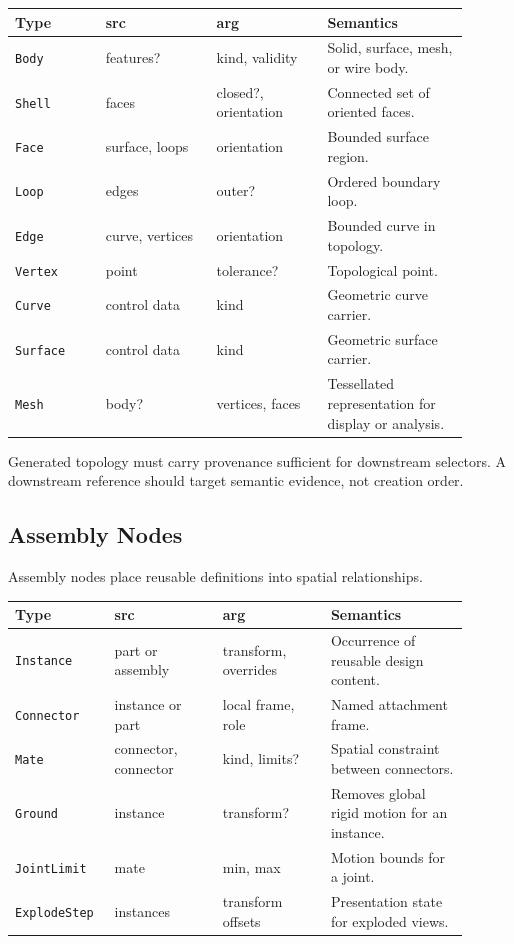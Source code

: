 \documentclass[11pt]{article}
\newcommand{\Type}[1]{\texttt{#1}}
\begin{document}
\begin{center}
\small
\begin{tabular}{@{}p{0.18\linewidth}p{0.22\linewidth}p{0.22\linewidth}p{0.28\linewidth}@{}}
\hline
\textbf{Type} & \textbf{src} & \textbf{arg} & \textbf{Semantics} \\
\hline
\Type{Body} & features? & kind, validity & Solid, surface, mesh, or wire body. \\
\Type{Shell} & faces & closed?, orientation & Connected set of oriented faces. \\
\Type{Face} & surface, loops & orientation & Bounded surface region. \\
\Type{Loop} & edges & outer? & Ordered boundary loop. \\
\Type{Edge} & curve, vertices & orientation & Bounded curve in topology. \\
\Type{Vertex} & point & tolerance? & Topological point. \\
\Type{Curve} & control data & kind & Geometric curve carrier. \\
\Type{Surface} & control data & kind & Geometric surface carrier. \\
\Type{Mesh} & body? & vertices, faces & Tessellated representation for display or analysis. \\
\hline
\end{tabular}
\end{center}

Generated topology must carry provenance sufficient for downstream selectors. A downstream reference should target semantic evidence, not creation order.

\subsection{Assembly Nodes}

Assembly nodes place reusable definitions into spatial relationships.

\begin{center}
\small
\begin{tabular}{@{}p{0.18\linewidth}p{0.22\linewidth}p{0.22\linewidth}p{0.28\linewidth}@{}}
\hline
\textbf{Type} & \textbf{src} & \textbf{arg} & \textbf{Semantics} \\
\hline
\Type{Instance} & part or assembly & transform, overrides & Occurrence of reusable design content. \\
\Type{Connector} & instance or part & local frame, role & Named attachment frame. \\
\Type{Mate} & connector, connector & kind, limits? & Spatial constraint between connectors. \\
\Type{Ground} & instance & transform? & Removes global rigid motion for an instance. \\
\Type{JointLimit} & mate & min, max & Motion bounds for a joint. \\
\Type{ExplodeStep} & instances & transform offsets & Presentation state for exploded views. \\
\hline
\end{tabular}
\end{center}
\end{document}
